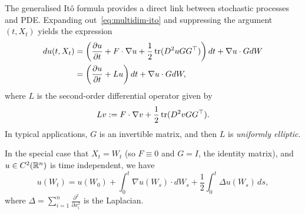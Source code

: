 \begin{remark}
    The generalised It\^{o} formula provides a direct link between stochastic processes and PDE. Expanding out~\eqref{eq:multidim-ito} and suppressing the argument $(t,X_t)$ yields the expression
    \begin{align*}
        du(t,X_t) &= \left(\frac{\partial u}{\partial t} + F\cdot\nabla u + \frac{1}{2}\operatorname{tr}(D^2u GG^\top)\right)dt + \nabla u\cdot GdW \\
        &= \left(\frac{\partial u}{\partial t} + Lu\right)dt + \nabla u\cdot GdW,
    \end{align*}
    where $L$ is the second-order differential operator given by
    \begin{equation*}
        Lv := F\cdot\nabla v + \frac{1}{2}\operatorname{tr}(D^2v GG^\top).
    \end{equation*}
    In typical applications, $G$ is an invertible matrix, and then $L$ is \emph{uniformly elliptic}.

    In the special case that $X_t=W_t$ (so $F\equiv 0$ and $G=I$, the identity matrix), and $u\in C^2(\mathbb{R}^n)$ is time independent, we have
    \begin{equation*}
        u(W_t) = u(W_0) + \int_0^t \nabla u(W_s)\cdot dW_s + \frac{1}{2}\int_0^t \Delta u(W_s)\,ds,
    \end{equation*}
    where $\Delta=\sum_{i=1}^n \frac{\partial^2}{\partial x^2_i}$ is the Laplacian.
\end{remark}

